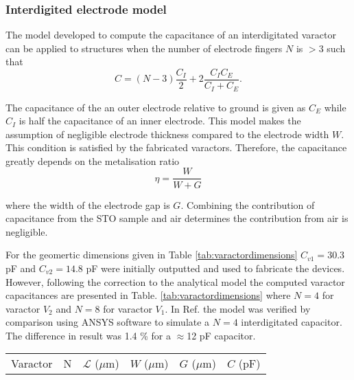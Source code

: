 \documentclass[10pt,a4paper,twoside]{article}
\begin{document}
\begin{multicols}{2}
\subsubsection{\label{subsubsection:interdigitedelectrodemodel}Interdigited electrode model}
The model developed to compute the capacitance of an interdigitated varactor can be applied to structures when the number of electrode fingers $N$ is $>$3 such that 
\begin{equation}
\label{eq:capacitanceinterdigited}
C=(N-3) \frac{C_{I}}{2}+2\frac{C_{I}C_{E}}{C_{I}+C_{E}}.
\end{equation}
\par
\noindent The capacitance of the an outer electrode relative to ground is given as $C_{E}$ while $C_{I}$ is half the capacitance of an inner electrode. This model makes the assumption of negligible electrode thickness compared to the electrode width $W$. This condition is satisfied by the fabricated varactors. Therefore, the capacitance greatly depends on the metalisation ratio
\begin{equation}
\label{eq:metalisationratio}
\eta =\frac{W}{W+G}
\end{equation}
\par
where the width of the electrode gap is $G$. Combining the contribution of capacitance from the STO sample and air determines the contribution from air is negligible. 
\par
For the geomertic dimensions given in Table \ref{tab:varactordimensions} $C_{v1}=30.3$ pF and $C_{v2}=14.8$ pF were initially outputted and used to fabricate the devices. However, following the correction to the analytical model the computed varactor capacitances are presented in Table. \ref{tab:varactordimensions} where $N=4$ for varactor $V_{2}$ and $N=8$ for varactor $V_{1}$. In Ref. \cite{Igreja2004AnalyticalStructure} the model was verified by comparison using ANSYS software to simulate a $N=4$ interdigitated capacitor. The difference in result was 1.4 \% for a $\approx$12 pF capacitor.    
\par
\vspace{1em}
\hspace*{-2em}\begin{minipage}[c]{0.45\textwidth}
\label{tab:varactordimensions}
\begin{center}
    \begin{tabular}{* {6}{l}} %
     \toprule
      Varactor & N & $\mathcal{L}$ ($\mu$m)  & $W$ ($\mu$m) & $G$ ($\mu$m) & $C$ (pF)

\end{tabular}
\end{center}
\end{minipage}
\end{multicols}
\end{document}
